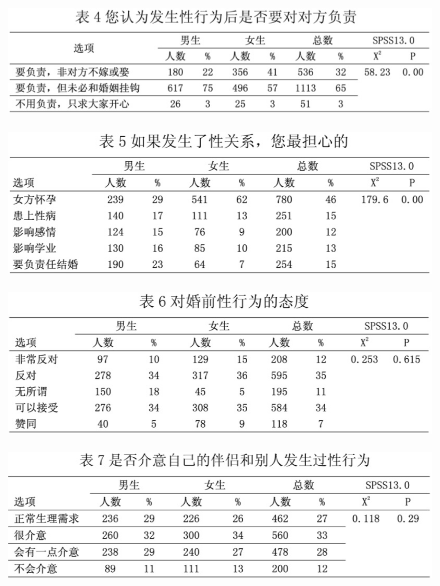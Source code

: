 \documentclass[UTF8,a4paper]{ctexart}
\begin{document}
\begin{figure}[ht]
    \centering
    \includegraphics[scale=0.4]{4.jpg}
    \end{figure}

\begin{figure}[ht]
    \centering
    \includegraphics[scale=0.4]{5.jpg}
    \end{figure}

\begin{figure}[ht]
    \centering
    \includegraphics[scale=0.4]{6.jpg}
    \end{figure}

\begin{figure}[h!]
    \centering
    \includegraphics[scale=0.4]{7.jpg}
    \end{figure}
\end{document}
